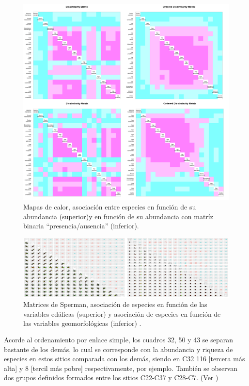 \documentclass[11pt,]{article}
\begin{document}
\begin{figure}
\centering
\includegraphics[width=1.00000\textwidth]{Análisis/Imágenes manuscrito/Heat_Map_R.png}
\caption{Mapas de calor, asociación entre especies en función de su
abundancia (superior)y en función de su abundancia con matríz binaria
``presencia/ausencia'' (inferior).\label{fig:heat1}}
\end{figure}

\begin{figure}
\centering
\includegraphics[width=1.00000\textwidth]{Análisis/Imágenes manuscrito/Seperman_R.png}
\caption{Matrices de Sperman, asociación de especies en función de las
variables edáficas (superior) y asociación de especies en función de las
variables geomorfológicas (inferior) .\label{fig:sper}}
\end{figure}

Acorde al ordenamiento por enlace simple, los cuadros 32, 50 y 43 se
separan bastante de los demás, lo cual se corresponde con la abundancia
y riqueza de especies en estos sitios comparada con los demás, siendo en
C32 116 {[}tercera más alta{]} y 8 {[}tercil más pobre{]}
respectivamente, por ejemplo. También se observan dos grupos definidos
formados entre los sitios C22-C37 y C28-C7. (Ver \label{fig:denS})
\end{document}
